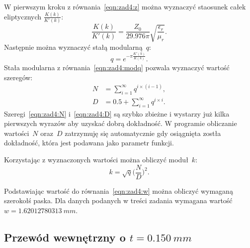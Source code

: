 \documentclass[rep.tex]{subfiles}
\begin{document}
W pierwszym kroku z równania~\ref{eqn:zad4:z} można wyznaczyć staosunek całek eliptycznych $\frac{K(k)}{K'(k)}$:
\begin{equation}
  \frac{K(k)}{K'(k)} = \frac{Z_0}{29.976 \pi}\sqrt{\frac{\epsilon_r}{\mu_r}}. \label{eqn:zad4:modk}
\end{equation}
Następnie można wyznaczyć stałą modularną~$q$:
\begin{equation}
  q = e^{- \pi \frac{K'(k)}{K(k)}}. \label{eqn:zad4:modq}
\end{equation}
Stała modularna z równania~\ref{eqn:zad4:modq} pozwala wyznaczyć wartość szeregów:
\begin{align}
  N &= \sum_{i=1}^\infty q^{i \times (i-1)}, \label{eqn:zad4:N} \\
  D &= 0.5 + \sum_{i=1}^\infty q^{i \times i}. \label{eqn:zad4:D}
\end{align}
Szeregi~\ref{eqn:zad4:N} i~\ref{eqn:zad4:D} są szybko zbieżne i wystarzy już kilka pierwszych wyrazów aby uzyskać dobrą dokładność.
W programie obliczanie wartości~$N$ oraz~$D$ zatrzymuję się automatycznie gdy osiągnięta zostła dokładność,
która jest podawana jako parametr funkcji.

Korzystając z wyznaczonych wartości można obliczyć moduł~$k$:
\begin{equation}
  k = \sqrt{q} \Big(\frac{N}{D}\Big)^2.
\end{equation}

Podstawiając wartość do równania~\ref{eqn:zad4:w} można obliczyć wymaganą szerokołś paska.
Dla danych podanych w treści zadania wymagana wartość $w = 1.62012780313~mm$.

\subsection{Przewód wewnętrzny o $t = 0.150~mm$}
\end{document}
